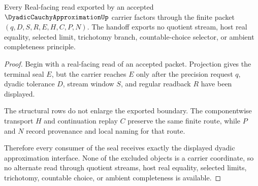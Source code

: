 \begin{theorem}
\label{thm:dyadic-cauchy-approximation-real-seal-handoff}
Every Real-facing read exported by an accepted $\DyadicCauchyApproximationUp$ carrier factors through the finite packet $(q,D,S,R,E,H,C,P,N)$. The handoff exports no quotient stream, host real equality, selected limit, trichotomy branch, countable-choice selector, or ambient completeness principle.
\end{theorem}
\begin{proof}
Begin with a real-facing read of an accepted packet. Projection gives the terminal seal $E$, but the carrier reaches $E$ only after the precision request $q$, dyadic tolerance $D$, stream window $S$, and regular readback $R$ have been displayed.

The structural rows do not enlarge the exported boundary. The componentwise transport $H$ and continuation replay $C$ preserve the same finite route, while $P$ and $N$ record provenance and local naming for that route.

Therefore every consumer of the seal receives exactly the displayed dyadic approximation interface. None of the excluded objects is a carrier coordinate, so no alternate read through quotient streams, host real equality, selected limits, trichotomy, countable choice, or ambient completeness is available.
\end{proof}


\begin{closurestatus}{\DyadicCauchyApproximationUp}
  \theoryclosure{\seedClosure}
  \formalstatus{\unformalizedV}
\end{closurestatus}
